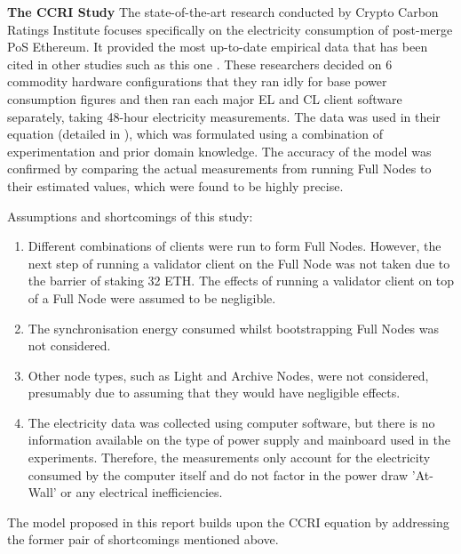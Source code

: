 \textbf{The CCRI Study } 
\label{CCRIModelLitRev}
The state-of-the-art research conducted by Crypto Carbon Ratings Institute focuses specifically on the electricity consumption of post-merge PoS Ethereum. It provided the most up-to-date empirical data that has been cited in other studies such as this one \cite{CryptoCarbonRatingsInstitute2022TheNetwork}. These researchers decided on 6 commodity hardware configurations that they ran idly for base power consumption figures and then ran each major EL and CL client software separately, taking 48-hour electricity measurements. The data was used in their equation (detailed in ), which was formulated using a combination of experimentation and prior domain knowledge. The accuracy of the model was confirmed by comparing the actual measurements from running Full Nodes to their estimated values, which were found to be highly precise.

Assumptions and shortcomings of this study:
\begin{enumerate}
    \item Different combinations of clients were run to form Full Nodes. However, the next step of running a validator client on the Full Node was not taken due to the barrier of staking 32 ETH. The effects of running a validator client on top of a Full Node were assumed to be negligible.
    
    \item The synchronisation energy consumed whilst bootstrapping Full Nodes was not considered.
    
    \item Other node types, such as Light and Archive Nodes, were not considered, presumably due to assuming that they would have negligible effects.

    \item The electricity data was collected using computer software, but there is no information available on the type of power supply and mainboard used in the experiments. Therefore, the measurements only account for the electricity consumed by the computer itself and do not factor in the power draw 'At-Wall' or any electrical inefficiencies.
\end{enumerate}

The model proposed in this report builds upon the CCRI equation by addressing the former pair of shortcomings mentioned above. 






